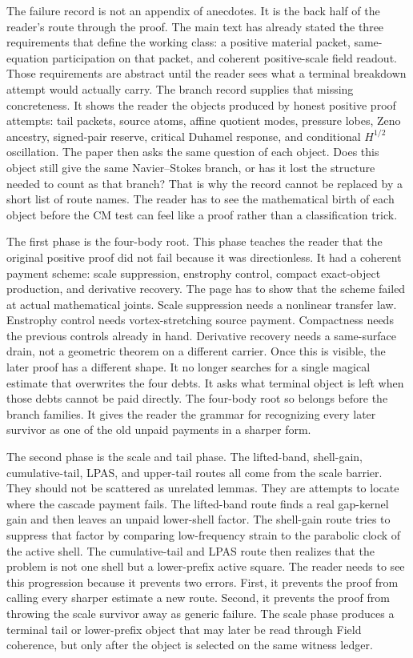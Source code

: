 The failure record is not an appendix of anecdotes.
It is the back half of the reader's route through the proof.
The main text has already stated the three requirements that define the working
class: a positive material packet, same-equation participation on that packet,
and coherent positive-scale field readout.
Those requirements are abstract until the reader sees what a terminal
breakdown attempt would actually carry.
The branch record supplies that missing concreteness.
It shows the reader the objects produced by honest positive proof attempts:
tail packets, source atoms, affine quotient modes, pressure lobes, Zeno
ancestry, signed-pair reserve, critical Duhamel response, and conditional
\(H^{1/2}\) oscillation.
The paper then asks the same question of each object.
Does this object still give the same Navier--Stokes branch, or has it lost the
structure needed to count as that branch?
That is why the record cannot be replaced by a short list of route names.
The reader has to see the mathematical birth of each object before the CM test
can feel like a proof rather than a classification trick.

The first phase is the four-body root.
This phase teaches the reader that the original positive proof did not fail
because it was directionless.
It had a coherent payment scheme: scale suppression, enstrophy control,
compact exact-object production, and derivative recovery.
The page has to show that the scheme failed at actual mathematical joints.
Scale suppression needs a nonlinear transfer law.
Enstrophy control needs vortex-stretching source payment.
Compactness needs the previous controls already in hand.
Derivative recovery needs a same-surface drain, not a geometric theorem on a
different carrier.
Once this is visible, the later proof has a different shape.
It no longer searches for a single magical estimate that overwrites the four
debts.
It asks what terminal object is left when those debts cannot be paid directly.
The four-body root so belongs before the branch families.
It gives the reader the grammar for recognizing every later survivor as one of
the old unpaid payments in a sharper form.

The second phase is the scale and tail phase.
The lifted-band, shell-gain, cumulative-tail, LPAS, and upper-tail routes all
come from the scale barrier.
They should not be scattered as unrelated lemmas.
They are attempts to locate where the cascade payment fails.
The lifted-band route finds a real gap-kernel gain and then leaves an unpaid
lower-shell factor.
The shell-gain route tries to suppress that factor by comparing low-frequency
strain to the parabolic clock of the active shell.
The cumulative-tail and LPAS route then realizes that the problem is not one
shell but a lower-prefix active square.
The reader needs to see this progression because it prevents two errors.
First, it prevents the proof from calling every sharper estimate a new route.
Second, it prevents the proof from throwing the scale survivor away as generic
failure.
The scale phase produces a terminal tail or lower-prefix object that may later
be read through Field coherence, but only after the object is selected on the
same witness ledger.

